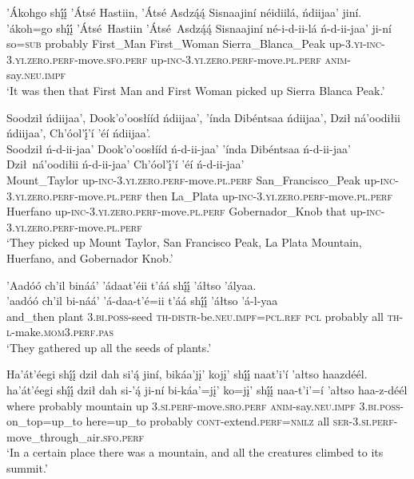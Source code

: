 \ea\label{ex:text4-2-13}
’Ákohgo shį́į́ ’Átsé Hastiin, ’Átsé Asdzą́ą́ Sisnaajiní néidiilá, ńdiijaa’ jiní.\\
\gll ’ákoh=go	shį́į́	’Átsé~{Hastiin}	’Átsé~{Asdzą́ą́}	Sisnaajiní	né-i-d-ii-lá	ń-d-ii-jaa’	ji-ní\\
     so=\textsc{sub}	probably	First\_Man	First\_Woman	Sierra\_Blanca\_Peak	up-3.\textsc{yi}-\textsc{inc}-3.\textsc{yi}.\textsc{zero}.\textsc{perf}-move.\textsc{sfo}.\textsc{perf}	up-\textsc{inc}-3.\textsc{yi}.\textsc{zero}.\textsc{perf}-move.\textsc{pl}.\textsc{perf}	\textsc{anim}-say.\textsc{neu}.\textsc{impf}\\
\glt `It was then that First Man and First Woman picked up Sierra Blanca Peak.'
\z

\ea\label{ex:text4-2-14}
Soodził ńdiijaa’, Dook’o’oosłííd ńdiijaa’, ’índa Dibéntsaa ńdiijaa’, Dził ná’oodiłii ńdiijaa’, Ch’óol’į́’í ’éí ńdiijaa’.\\
\gll Soodził	ń-d-ii-jaa’	Dook’o’oosłííd	ń-d-ii-jaa’	’índa	Dibéntsaa	ń-d-ii-jaa’	Dził~{ná’oodiłii}	ń-d-ii-jaa’	Ch’óol’į́’í	’éí	ń-d-ii-jaa’\\
     Mount\_Taylor	up-\textsc{inc}-3.\textsc{yi}.\textsc{zero}.\textsc{perf}-move.\textsc{pl}.\textsc{perf}	San\_Francisco\_Peak	up-\textsc{inc}-3.\textsc{yi}.\textsc{zero}.\textsc{perf}-move.\textsc{pl}.\textsc{perf}	then	La\_Plata	up-\textsc{inc}-3.\textsc{yi}.\textsc{zero}.\textsc{perf}-move.\textsc{pl}.\textsc{perf}	Huerfano	up-\textsc{inc}-3.\textsc{yi}.\textsc{zero}.\textsc{perf}-move.\textsc{pl}.\textsc{perf}	Gobernador\_Knob	that	up-\textsc{inc}-3.\textsc{yi}.\textsc{zero}.\textsc{perf}-move.\textsc{pl}.\textsc{perf}\\
\glt `They picked up Mount Taylor, San Francisco Peak, La Plata Mountain, Huerfano, and Gobernador Knob.'
\z

\ea\label{ex:text4-2-15}
’Aadóó ch’il bináá’ ’ádaat’éii t’áá shį́į́ ’áłtso ’ályaa.\\
\gll ’aadóó	ch’il	bi-náá’	’á-daa-t’é=ii	t’áá	shį́į́	’áłtso	’á-l-yaa\\
     and\_then	plant	3.\textsc{bi}.\textsc{poss}-seed	\textsc{th}-\textsc{distr}-be.\textsc{neu}.\textsc{impf}=\textsc{pcl}.\textsc{ref}	\textsc{pcl}	probably	all	\textsc{th}-\textsc{l}-make.\textsc{mom}3.\textsc{perf}.\textsc{pas}\\
\glt `They gathered up all the seeds of plants.'
\z

\ea\label{ex:text4-2-16}
Ha’át’éegi shį́į́ dził dah si’ą́ jiní, bikáa’jį’ kojį’ shį́į́ naat’i’í ’ałtso haazdéél.\\
\gll ha’át’éegi	shį́į́	dził	dah	si-’ą́	ji-ní	bi-káa’=jį’	ko=jį’	shį́į́	naa-t’i’=í	’ałtso	haa-z-déél\\
     where	probably	mountain	up	3.\textsc{si}.\textsc{perf}-move.\textsc{sro}.\textsc{perf}	\textsc{anim}-say.\textsc{neu}.\textsc{impf}	3.\textsc{bi}.\textsc{poss}-on\_top=up\_to	here=up\_to	probably	\textsc{cont}-extend.\textsc{perf}=\textsc{nmlz}	all	\textsc{ser}-3.\textsc{si}.\textsc{perf}-move\_through\_air.\textsc{sfo}.\textsc{perf}\\
\glt `In a certain place there was a mountain, and all the creatures climbed to its summit.'
\z

